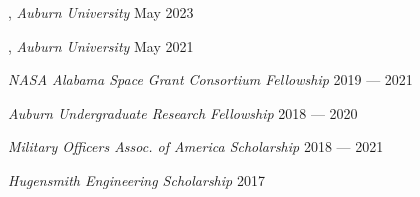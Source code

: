 
, \textit{Auburn University}	\hfill May 2023

, \textit{Auburn University} \hfill	May 2021

\textit{NASA Alabama Space Grant Consortium Fellowship} 	\hfill 2019 --- 2021

\textit{Auburn Undergraduate Research Fellowship} \hfill	2018 --- 2020

\textit{Military Officers Assoc. of America Scholarship} \hfill	2018 --- 2021

\textit{Hugensmith Engineering Scholarship} \hfill	2017




